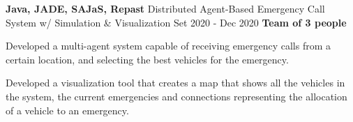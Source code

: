 \cventry
  {\textbf{Java, JADE, SAJaS, Repast}}
  {Distributed Agent-Based Emergency Call System w/ Simulation \& Visualization \href{https://github.com/EduRibeiro00/EmergencyCallSystem-feup-aiad}{\faExternalLink}} %
  {Set 2020 - Dec 2020}
  {\textbf{Team of 3 people}}
  {
    \begin{cvitems} %
      \item {Developed a multi-agent system capable of receiving emergency calls from a certain location, and selecting the best vehicles for the emergency.}
      \item {Developed a visualization tool that creates a map that shows all the vehicles in the system, the current emergencies and connections representing the allocation of a vehicle to an emergency.}
    \end{cvitems}
  }